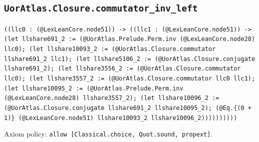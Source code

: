 \documentclass[11pt]{article}
\begin{document}
\subsection*{\texttt{UorAtlas.Closure.commutator\_inv\_left}}
\noindent\texttt{((llc0 : (@LexLeanCore.node51)) -> ((llc1 : (@LexLeanCore.node51)) -> (let llshare691\_2 := (@UorAtlas.Prelude.Perm.inv (@LexLeanCore.node28) llc0); (let llshare10093\_2 := (@UorAtlas.Closure.commutator llshare691\_2 llc1); (let llshare5106\_2 := (@UorAtlas.Closure.conjugate llshare691\_2); (let llshare3556\_2 := (@UorAtlas.Closure.commutator llc0); (let llshare3557\_2 := (@UorAtlas.Closure.commutator llc0 llc1); (let llshare10095\_2 := (@UorAtlas.Prelude.Perm.inv (@LexLeanCore.node28) llshare3557\_2); (let llshare10096\_2 := (@UorAtlas.Closure.conjugate llshare691\_2 llshare10095\_2); (@Eq.\{(0 + 1)\} (@LexLeanCore.node51) llshare10093\_2 llshare10096\_2))))))))))}\par
\noindent Axiom policy: \texttt{allow [Classical.choice, Quot.sound, propext]}.\par
\end{document}
